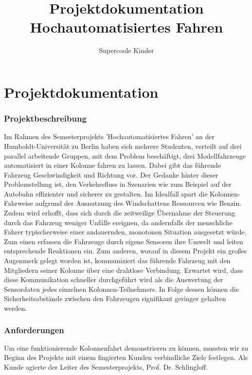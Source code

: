 \documentclass[a4paper, 12pt, titlepage]{scrartcl}
\begin{document}
\author{Supercoole Kinder}
\title{Projektdokumentation\\Hochautomatisiertes Fahren}
\publishers{Humboldt-Universit\"at zu Berlin}
\maketitle
\tableofcontents

\part{Projektdokumentation}
	\section{Projektbeschreibung}
	\label{projektbeschreibung}
		Im Rahmen des Semesterprojekts 'Hochautomatisiertes Fahren' an der Humboldt-Universität zu Berlin haben sich mehrere Studenten, verteilt auf drei parallel arbeitende Gruppen,
		mit dem Problem beschäftigt, drei Modellfahrzeuge automatisiert in einer Kolonne fahren zu lassen.
		Dabei gibt das führende Fahrzeug Geschwindigkeit und Richtung vor. Der Gedanke hinter dieser Problemstellung ist,
		den Verkehrsfluss in Szenarien wie zum Beispiel auf der Autobahn effizienter und sicherer zu gestalten.
		Im Idealfall spart die Kolonnen-Fahrweise aufgrund der Ausnutzung des Windschattens Ressourcen wie Benzin.
		Zudem wird erhofft, dass sich durch die zeitweilige Übernahme der Steuerung durch das Fahrzeug weniger Unfälle ereignen,
		da andernfalls der menschliche Fahrer typischerweise einer andauernden, monotonen Situation ausgesetzt würde.
		Zum einen erfassen die Fahrzeuge durch eigene Sensoren ihre Umwelt und leiten entsprechende Reaktionen ein.
		Zum anderen, worauf in diesem Projekt ein großes Augenmerk gelegt worden ist, kommuniziert das führende Fahrzeug mit den Mitgliedern seiner Kolonne über eine drahtlose Verbindung.
		Erwartet wird, dass diese Kommunikation schneller durchgeführt wird als die Auswertung der Sensordaten jedes einzelnen Kolonnen-Teilnehmers.
		In Folge dessen können die Sicherheitsabstände zwischen den Fahrzeugen signifikant geringer gehalten werden.
	\section{Anforderungen}
	\label{anforderungen}
		Um eine funktionierende Kolonnenfahrt demonstrieren zu können, mussten wir zu Beginn des Projekts mit einem fingierten Kunden verbindliche Ziele festlegen.
		Als Kunde agierte der Leiter des Semesterprojekts, Prof. Dr. Schlingloff.
\end{document}
